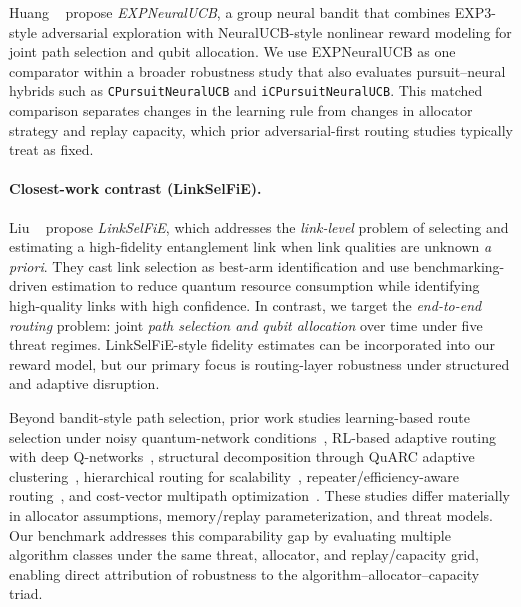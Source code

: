 Huang \etal~\cite{huang2024quantum} propose \emph{EXPNeuralUCB}, a group neural bandit that combines EXP3-style adversarial exploration with NeuralUCB-style nonlinear reward modeling for joint path selection and qubit allocation. We use EXPNeuralUCB as one comparator within a broader robustness study that also evaluates pursuit--neural hybrids such as \texttt{CPursuitNeuralUCB} and \texttt{iCPursuitNeuralUCB}. This matched comparison separates changes in the learning rule from changes in allocator strategy and replay capacity, which prior adversarial-first routing studies typically treat as fixed.

\paragraph{Closest-work contrast (LinkSelFiE).}
Liu \etal~\cite{10621263} propose \emph{LinkSelFiE}, which addresses the \emph{link-level} problem of selecting and estimating a high-fidelity entanglement link when link qualities are unknown \emph{a priori}. They cast link selection as best-arm identification and use benchmarking-driven estimation to reduce quantum resource consumption while identifying high-quality links with high confidence. In contrast, we target the \emph{end-to-end routing} problem: joint \emph{path selection and qubit allocation} over time under five threat regimes. LinkSelFiE-style fidelity estimates can be incorporated into our reward model, but our primary focus is routing-layer robustness under structured and adaptive disruption.

Beyond bandit-style path selection, prior work studies learning-based route selection under noisy quantum-network conditions~\cite{chaudhary2023quantum}, RL-based adaptive routing with deep Q-networks~\cite{jallowkhan2025adaptive}, structural decomposition through QuARC adaptive clustering~\cite{clayton2024quarc}, hierarchical routing for scalability~\cite{cicconetti2024scalable}, repeater/efficiency-aware routing~\cite{kumar2024routing}, and cost-vector multipath optimization~\cite{leone2021costvector}. These studies differ materially in allocator assumptions, memory/replay parameterization, and threat models. Our benchmark addresses this comparability gap by evaluating multiple algorithm classes under the same threat, allocator, and replay/capacity grid, enabling direct attribution of robustness to the algorithm--allocator--capacity triad.


